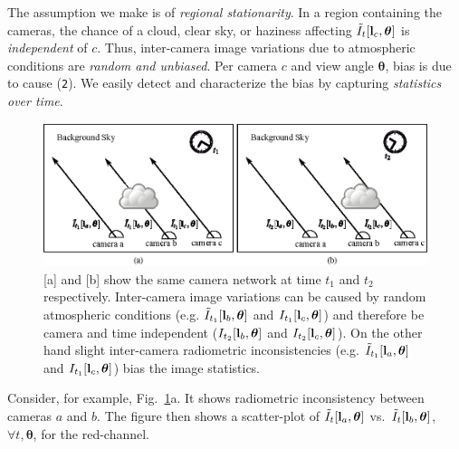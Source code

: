 \documentclass[runningheads]{llncs}
\begin{document}
The assumption we make is of {\em regional stationarity}. In a region containing the cameras, the chance of a cloud, clear sky, or haziness affecting $\tilde I_t[{\bf l}_c,{\bm \theta}]$ is {\em independent} of $c$. Thus, inter-camera image variations due to atmospheric conditions are {\em random and unbiased}. Per camera $c$ and view angle ${\bm \theta}$, bias is due to cause ({\tt 2}). We easily detect and characterize the bias by capturing {\em statistics over time}.
\begin{figure}[t!]
\begin{center}
   \includegraphics[width=\linewidth]{figures/regional_stationarity.eps}
\end{center}
   \vspace{-0.6cm}
   \caption{[a] and [b] show the same camera network at time $t_1$ and $t_2$ respectively. Inter-camera image variations can be caused by random atmospheric conditions (e.g. $\tilde I_{t_1}[{\bf l}_b,{\bm \theta}]$ and $I_{t_1}[{\bf l}_c,{\bm \theta}]$) and therefore be camera and time independent ($I_{t_2}[{\bf l}_b,{\bm \theta}]$ and $I_{t_2}[{\bf l}_c,{\bm \theta}]$). On the other hand slight inter-camera radiometric inconsistencies (e.g. $\tilde I_{t_1}[{\bf l}_a,{\bm \theta}]$ and $I_{t_1}[{\bf l}_c,{\bm \theta}]$) bias the image statistics.
   }
\label{fig:calibration}
\end{figure}
Consider, for example, Fig.~\ref{fig:calibration}a. It shows radiometric inconsistency between cameras $a$ and $b$. The figure then shows a scatter-plot of
$\tilde I_t[{\bf l}_a,{\bm \theta}]$ vs.~$\tilde I_t[{\bf l}_{b},{\bm \theta}]$, $\forall t,{\bm \theta}$, for the red-channel.
\end{document}
